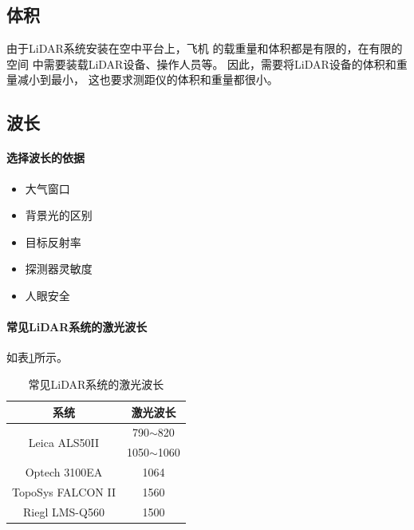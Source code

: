 \subsection{体积} %
由于LiDAR系统安装在空中平台上，飞机 的载重量和体积都是有限的，在有限的空间 中需要装载LiDAR设备、操作人员等。
因此，需要将LiDAR设备的体积和重量减小到最小， 这也要求测距仪的体积和重量都很小。

\subsection{波长} %
\paragraph{选择波长的依据}
\begin{itemize}
	\item 大气窗口
	\item 背景光的区别
	\item 目标反射率
	\item 探测器灵敏度
	\item 人眼安全
\end{itemize}

\paragraph{常见LiDAR系统的激光波长} 如表\ref{tab:常见LiDAR系统的激光波长}所示。

\begin{table}[!htbp]
	\centering
	\begin{tabular}{|c|c|}
		\hline
		              系统              &       激光波长       \\ \hline
		\multirow{2}{*}{Leica ALS50II} &  790$ \sim $820  \\ \cline{2-2}
		                               & 1050$ \sim $1060 \\ \hline
		        Optech 3100EA          &       1064       \\ \hline
		      TopoSys FALCON II        &       1560       \\ \hline
		        Riegl LMS-Q560         &       1500       \\ \hline
	\end{tabular}
	\caption{常见LiDAR系统的激光波长}
	\label{tab:常见LiDAR系统的激光波长}
\end{table}

